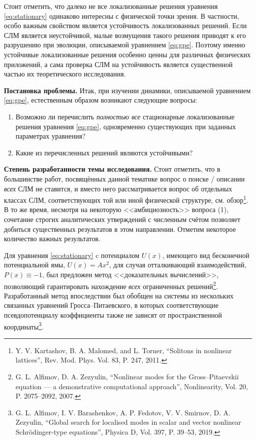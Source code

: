 \documentclass[candidate, href, colorlinks]{disser}
\begin{document}
Стоит отметить, что далеко не все локализованные решения уравнения \eqref{eq:stationary} одинаково интересны с физической точки зрения.
В частности, особо важным свойством является устойчивость локализованных решений.
Если СЛМ является неустойчивой, малые возмущения такого решения приводят к его разрушению при эволюции, описываемой уравнением \eqref{eq:gpe}.
Поэтому именно устойчивые локализованные решения особенно ценны для различных физических приложений, а сама проверка СЛМ на устойчивость является существенной частью их теоретического исследования.

\textbf{Постановка проблемы.}
Итак, при изучении динамики, описываемой уравнением \eqref{eq:gpe}, естественным образом возникают следующие вопросы:
\begin{enumerate}
	\item Возможно ли перечислить {\it полностью все} стационарные локализованные решения уравнения \eqref{eq:gpe}, одновременно существующих при заданных параметрах уравнения?
	\item Какие из перечисленных решений являются устойчивыми?
\end{enumerate}

\textbf{Степень разработанности темы исследования.}
Стоит отметить, что в большинстве работ, посвящённых данной тематике вопрос о поиске / описании {\it всех} СЛМ не ставится, и вместо него рассматривается вопрос об отдельных классах СЛМ, соответствующих той или иной физической структуре, см. обзор\footnote{Y. V. Kartashov, B. A. Malomed, and L. Torner, ``Solitons in nonlinear lattices'', Rev. Mod. Phys. Vol. 83, P. 247, 2011.}.
В то же время, несмотря на некоторую <<амбициозность>> вопроса (1), сочетание строгих аналитических утверждений с численным счётом позволяет добиться существенных результатов в этом направлении. 
Отметим некоторое количество важных результатов.

Для уравнения \eqref{eq:stationary} c потенциалом $U(x)$, имеющего вид бесконечной потенциальной ямы, $U(x) = A x^2$, для случая отталкивающий взаимодействий, $P(x) \equiv -1$, был предложен метод <<доказательных вычислений>>, позволяющий гарантировать нахождение {\it всех} ограниченных решений\footnote{G. L. Alfimov, D. A. Zezyulin, ``Nonlinear modes for the Gross--Pitaevskii equation --- a demonstrative computational approach'', Nonlinearity, Vol. 20, P. 2075--2092, 2007.}.
Разработанный метод впоследствии был обобщен на системы из нескольких связанных уравнений Гросса--Питаевского, в которых соответствующие псевдопотенциалу коэффициенты также не зависят от пространственной координаты\footnote{G. L. Alfimov, I. V. Barashenkov, A. P. Fedotov, V. V. Smirnov, D. A. Zezyulin, ``Global search for localised modes in scalar and vector nonlinear Schr{\"o}dinger-type equations'', Physica D, Vol. 397, P. 39--53, 2019.}.
\end{document}
